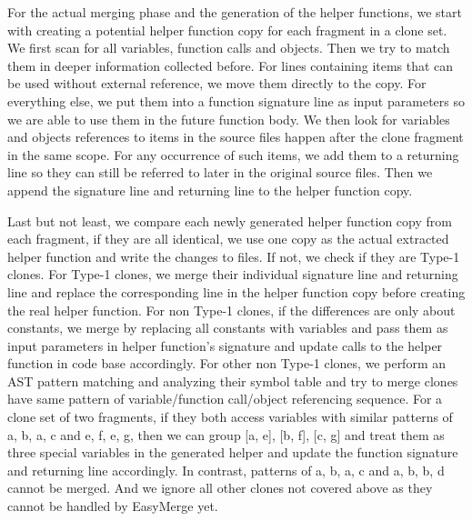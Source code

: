 \documentclass{acm_proc_article-sp}
\begin{document}
For the actual merging phase and the generation of the helper functions, 
we start with creating a potential helper function copy for each fragment in a clone set. 
We first scan for all variables, function calls and objects. Then we try to match them in 
deeper information collected before. For lines containing items that can be used without external reference, we move them directly to the copy. For everything else,
we put them into a function signature line as input parameters so we are able to use them in the future function body. 
We then look for variables and objects references to items in the 
source files happen after the clone fragment in the same scope. For any occurrence of such items, we add them to a returning line so they can still be referred to 
later in the original source files. Then we append the signature line and returning line to the helper function copy.

Last but not least, we compare each newly generated helper function copy from each fragment, if they are all identical, we use one copy as the actual extracted helper function
and write the changes to files. If not, we check if they are Type-1 clones. For Type-1 clones, we merge their individual signature line and returning line and
replace the corresponding line in the helper function copy before creating the real helper function. For non Type-1 clones, if the differences are only about constants,
we merge by replacing all constants with variables and pass them as input parameters in helper function's signature and update calls to the helper function in code base accordingly.
For other non Type-1 clones, we perform an AST pattern matching and analyzing their
symbol table and try to merge clones have same pattern of variable/function call/object referencing sequence. For a clone set of two fragments, if they both access variables
with similar patterns of a, b, a, c and e, f, e, g, then we can group [a, e], [b, f], [c, g] and treat them as three special variables in the generated helper and update
the function signature and returning line accordingly. In contrast, patterns of a, b, a, c and a, b, b, d cannot be merged. And we ignore all other clones not covered above
as they cannot be handled by EasyMerge yet.
\end{document}
